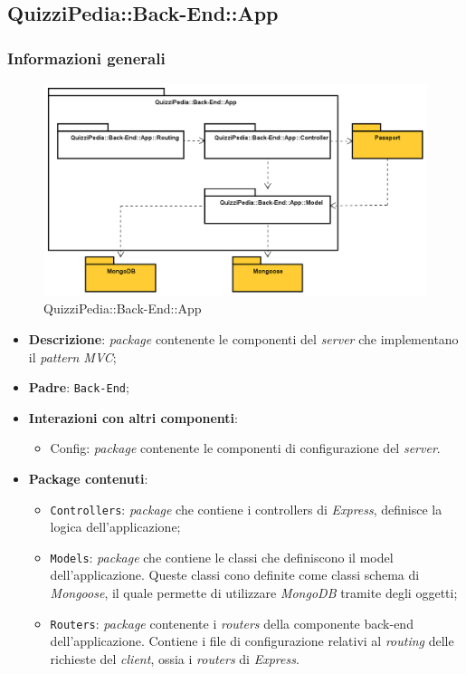 \subsection{QuizziPedia::Back-End::App}
\subsubsection{Informazioni generali}
\label{QuizziPedia::Back-End::App}
\begin{figure}[ht]
	\centering
	\includegraphics[scale=0.5]{UML/Package/QuizziPedia_Back-End_App.png}
	\caption{QuizziPedia::Back-End::App}
\end{figure}
\FloatBarrier
	\begin{itemize}
		\item \textbf{Descrizione}:
		\textit{package} contenente le componenti del \textit{server} che implementano il \textit{pattern\ped{G} MVC};
		\item \textbf{Padre}: \texttt{Back-End};
		\item \textbf{Interazioni con altri componenti}:
			\begin{itemize}
				\item Config:
				\textit{package} contenente le componenti di configurazione del \textit{server}.
			\end{itemize}
		\item \textbf{Package contenuti}:
			\begin{itemize}
				\item \texttt{Controllers}:
				\textit{package} che contiene i controllers di \textit{Express}, definisce la logica dell'applicazione;
				\item \texttt{Models}:
				\textit{package} che contiene le classi che definiscono il model dell'applicazione. Queste classi cono definite come classi schema di \textit{Mongoose}, il quale permette di utilizzare \textit{MongoDB} tramite degli oggetti;
				\item \texttt{Routers}:
				\textit{package} contenente i \textit{routers} della componente back-end dell'applicazione. Contiene i file di configurazione relativi al \textit{routing} delle richieste del \textit{client}, ossia i \textit{routers} di \textit{Express}.
			\end{itemize}
	\end{itemize}